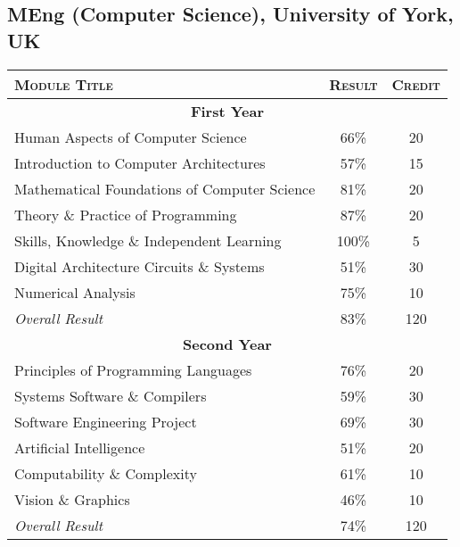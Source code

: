 \documentclass[a4paper,10pt]{article}
\newcommand{\detail}[2]{\hypertarget{details:#1}{\subsection{#2}}}
\begin{document}
\detail{csyork}{MEng (Computer Science), University of York, UK}
\begin{tabular}{p{11cm}|c|c}
  \hline
  \textsc{Module Title}                        & \textsc{Result} & \textsc{Credit}\\

  \hline \multicolumn{3}{c}{\textbf{First Year}} \\ \hline
  Human Aspects of Computer Science            & 66\%            & 20\\
  Introduction to Computer Architectures       & 57\%            & 15\\
  Mathematical Foundations of Computer Science & 81\%            & 20\\
  Theory \& Practice of Programming            & 87\%            & 20\\
  Skills, Knowledge \& Independent Learning    & 100\%           & 5\\
  Digital Architecture Circuits \& Systems     & 51\%            & 30\\
  Numerical Analysis                           & 75\%            & 10\\
  \hline \textit{Overall Result}               & 83\%            & 120\\

  \hline \multicolumn{3}{c}{\textbf{Second Year}} \\ \hline
  Principles of Programming Languages          & 76\%            & 20\\
  Systems Software \& Compilers                & 59\%            & 30\\
  Software Engineering Project                 & 69\%            & 30\\
  Artificial Intelligence                      & 51\%            & 20\\
  Computability \& Complexity                  & 61\%            & 10\\
  Vision \& Graphics                           & 46\%            & 10\\
  \hline \textit{Overall Result}               & 74\%            & 120\\
  \hline
\end{tabular}
\end{document}
